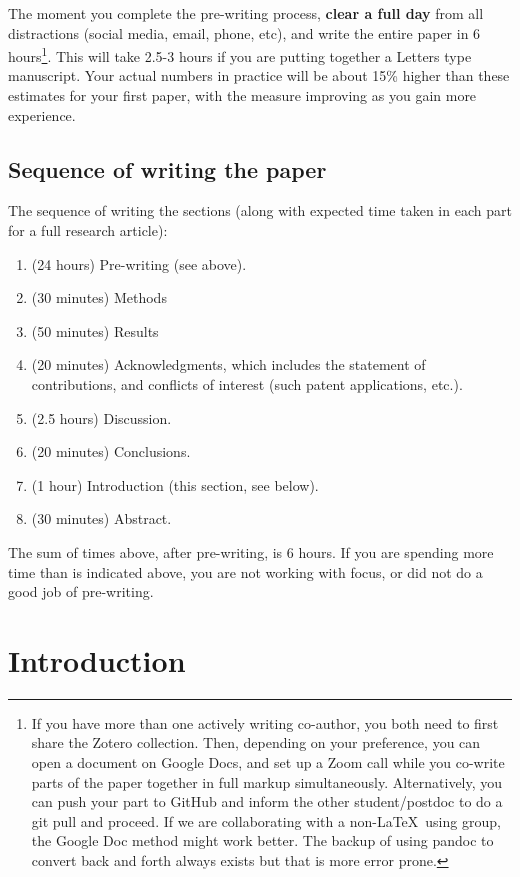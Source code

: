 \documentclass[12pt,twocolumn]{article}
\begin{document}
The moment you complete the pre-writing process, \textbf{clear a full day} from all distractions (social media, email, phone, etc), and write the entire paper in 6 hours\footnote{If you have more than one actively writing co-author, you both need to first share the Zotero collection. Then, depending on your preference, you can open a document on Google Docs, and set up a Zoom call while you co-write parts of the paper together in full markup simultaneously. Alternatively, you can push your part to GitHub and inform the other student/postdoc to do a git pull and proceed. If we are collaborating with a non-\LaTeX\ using group, the Google Doc method might work better. The backup of using pandoc to convert back and forth always exists but that is more error prone.}. This will take 2.5-3 hours if you are putting together a Letters type manuscript. Your actual numbers in practice will be about 15\% higher than these estimates for your first paper, with the measure improving as you gain more experience.

\subsection{Sequence of writing the paper}

The sequence of writing the sections (along with expected time taken in each part for a full research article):

\begin{enumerate}
\item (24 hours) Pre-writing (see above).
\item (30 minutes) Methods
\item (50 minutes) Results
\item (20 minutes) Acknowledgments, which includes the statement of contributions, and conflicts of interest (such patent applications, etc.).
\item (2.5 hours) Discussion.
\item (20 minutes) Conclusions.
\item (1 hour) Introduction (this section, see below).
\item (30 minutes) Abstract.
\end{enumerate}

The sum of times above, after pre-writing, is 6 hours. If you are spending more time than is indicated above, you are not working with focus, or did not do a good job of pre-writing.

\section{Introduction}
\label{sec:introduction}
\end{document}
